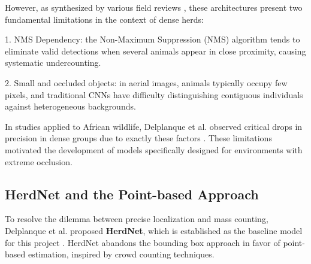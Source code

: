 However, as synthesized by various field reviews \cite{xu-review}, these architectures present two fundamental limitations in the context of dense herds:

1. NMS Dependency: the Non-Maximum Suppression (NMS) algorithm tends to eliminate valid detections when several animals appear in close proximity, causing systematic undercounting.

2. Small and occluded objects: in aerial images, animals typically occupy few pixels, and traditional CNNs have difficulty distinguishing contiguous individuals against heterogeneous backgrounds.

In studies applied to African wildlife, Delplanque et al. observed critical drops in precision in dense groups due to exactly these factors \cite{delplanque-data}. These limitations motivated the development of models specifically designed for environments with extreme occlusion.

\subsection{HerdNet and the Point-based Approach}

To resolve the dilemma between precise localization and mass counting, Delplanque et al. proposed \textbf{HerdNet}, which is established as the baseline model for this project \cite{herdnet}. HerdNet abandons the bounding box approach in favor of point-based estimation, inspired by crowd counting techniques.

